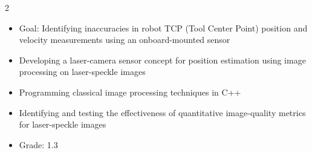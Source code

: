 \documentclass[9pt,a4paper,withhyper]{altacv}
\begin{document}
\begin{paracol}{2}
  \divider

    \begin{itemize}
        \item Goal: Identifying inaccuracies in robot TCP (Tool Center Point) position and velocity measurements using an onboard-mounted sensor
        \item Developing a laser-camera sensor concept for position estimation using image processing on laser-speckle images
        \item Programming classical image processing techniques in C++
        \item Identifying and testing the effectiveness of quantitative image-quality metrics for laser-speckle images
        \item Grade: 1.3
    \end{itemize}




\end{paracol}
\end{document}
